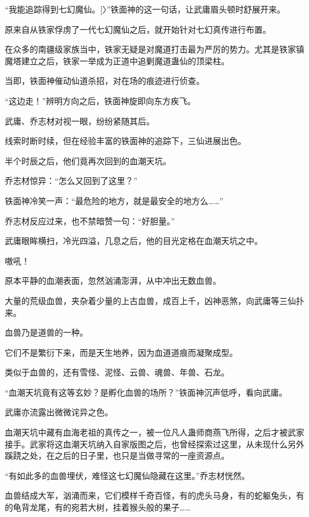 
\begin{this_body}

“我能追踪得到七幻魔仙。[〉”铁面神的这一句话，让武庸眉头顿时舒展开来。

原来自从铁家俘虏了一代七幻魔仙之后，就开始针对七幻真传进行布置。

在众多的南疆级家族当中，铁家无疑是对魔道打击最为严厉的势力。尤其是铁家镇魔塔建立之后，铁家一举成为正道中追剿魔道蛊仙的顶梁柱。

当即，铁面神催动仙道杀招，对在场的痕迹进行侦查。

“这边走！”辨明方向之后，铁面神旋即向东方疾飞。

武庸、乔志材对视一眼，纷纷紧随其后。

线索时断时续，但在经验丰富的铁面神的追踪下，三仙进展出色。

半个时辰之后，他们竟再次回到的血潮天坑。

乔志材惊异：“怎么又回到了这里？”

铁面神冷笑一声：“最危险的地方，就是最安全的地方么……”

乔志材反应过来，也不禁暗赞一句：“好胆量。”

武庸眼眸横扫，冷光四溢，几息之后，他的目光定格在血潮天坑之中。

嗷吼！

原本平静的血潮表面，忽然汹涌澎湃，从中冲出无数血兽。

大量的荒级血兽，夹杂着少量的上古血兽，成百上千，凶神恶煞，向武庸等三仙扑来。

血兽乃是道兽的一种。

它们不是繁衍下来，而是天生地养，因为血道道痕而凝聚成型。

类似于血兽的，还有雪怪、泥怪、云兽、魂兽、年兽、石龙。

“血潮天坑竟有这等玄妙？是孵化血兽的场所？”铁面神沉声低呼，看向武庸。

武庸亦流露出微微诧异之色。

血潮天坑中藏有血海老祖的真传之一，被一位凡人蛊师商燕飞所得，之后才被武家接手。武家将这血潮天坑纳入自家版图之后，也曾经探索过这里，从未现什么另外蹊跷之处，在之后的日子里，也只是当做寻常的一座资源点。

“有如此多的血兽埋伏，难怪这七幻魔仙隐藏在这里。”乔志材恍然。

血兽结成大军，汹涌而来，它们模样千奇百怪，有的虎头马身，有的蛇躯兔头，有的龟背龙尾，有的宛若大树，挂着猴头般的果子……


\end{this_body}
